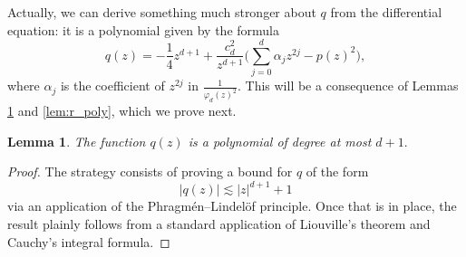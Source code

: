 \documentclass[a4paper,reqno,12pt]{amsart}
\newtheorem{lemma}[theorem]{Lemma}
\newcommand{\p}{\varphi}
\begin{document}
Actually, we can derive something much stronger about $q$ from the differential equation: it is a polynomial given by the formula
\begin{equation*}
    q(z) = -\frac{1}{4} z^{d+1} + \frac{c_d^2}{z^{d+1}}\Bigg(\sum_{j = 0}^{d } \alpha_{j} z^{2j} -p(z)^2\Bigg),
\end{equation*}
where $\alpha_j$ is the coefficient of $z^{2j}$ in $\frac{1}{\p_d(z)^2}$. This will be a consequence of Lemmas \ref{lem:q_poly} and \ref{lem:r_poly}, which we prove next.

\begin{lemma}\label{lem:q_poly} The function $q(z)$ is a polynomial of degree at most $d+1.$
\end{lemma}
\begin{proof}
The strategy consists of proving a bound for $q$ of the form
\begin{equation*}
    |q(z)| \lesssim|z|^{d+1} + 1
\end{equation*}
via an application of the Phragmén--Lindelöf principle. Once that is in place, the result plainly follows from a standard application of Liouville's theorem and Cauchy's integral formula.



\end{proof}
\end{document}
